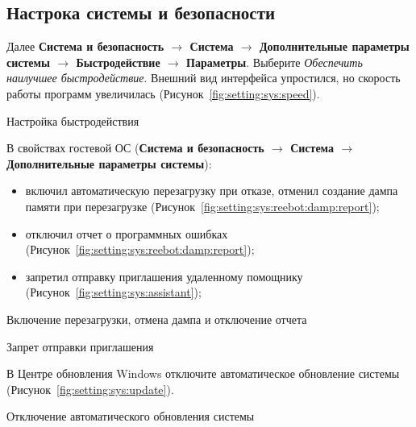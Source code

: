 \subsection{Настрока системы и безопасности}

Далее \textbf{Система и безопасность $\rightarrow$ Система $\rightarrow$
Дополнительные параметры системы $\rightarrow$
Быстродействие $\rightarrow$ Параметры}.
Выберите \textit{Обеспечить наилучшее быстродействие}.
Внешний вид интерфейса упростился, но скорость работы программ увеличилась
(Рисунок~\ref{fig:setting:sys:speed}).

\begin{image}
	\caption{Настройка быстродействия}
	\label{fig:setting:sys:speed}
\end{image}


В свойствах гостевой ОС
(\textbf{Система и безопасность $\rightarrow$ Система
$\rightarrow$ Дополнительные параметры системы}):

\begin{itemize}
	\item включил автоматическую перезагрузку при отказе,
		отменил создание дампа памяти при перезагрузке
		(Рисунок~\ref{fig:setting:sys:reebot:damp:report});
	\item отключил отчет о программных ошибках
		(Рисунок~\ref{fig:setting:sys:reebot:damp:report});
	\item запретил отправку приглашения удаленному помощнику
		(Рисунок~\ref{fig:setting:sys:assistant});
\end{itemize}

\begin{image}
	\caption{Включение перезагрузки, отмена дампа и отключение отчета}
	\label{fig:setting:sys:reebot:damp:report}
\end{image}

\begin{image}
	\caption{Запрет отправки приглашения}
	\label{fig:setting:sys:assistant}
\end{image}

В Центре обновления Windows отключите автоматическое обновление системы
(Рисунок~\ref{fig:setting:sys:update}).

\begin{image}
	\caption{Отключение автоматического обновления системы}
	\label{fig:setting:sys:update}
\end{image}

